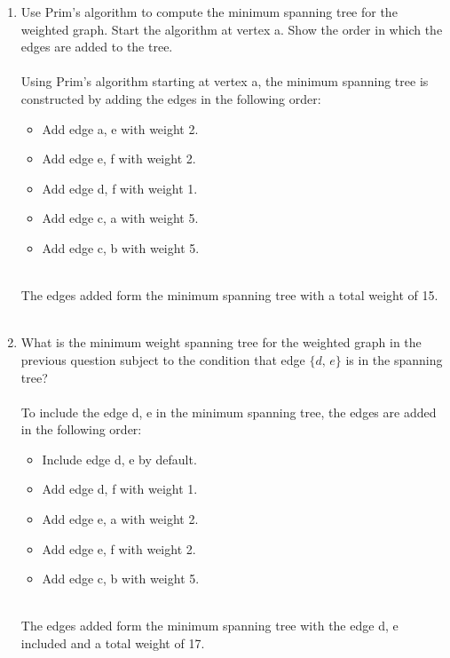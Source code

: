 \documentclass{amsart}
\theoremstyle{definition}
\theoremstyle{Exercise}
\theoremstyle{remark}
\theoremstyle{rule}
\numberwithin{equation}{section}
\begin{document}
\begin{enumerate}[label=(\alph*)]
\item Use Prim's algorithm to compute the minimum spanning tree for the weighted graph. Start the algorithm at vertex a. Show the order in which the edges are added to the tree.\\\\
Using Prim's algorithm starting at vertex a, the minimum spanning tree is constructed by adding the edges in the following order:\\
    \begin{itemize}
        \item Add edge {a, e} with weight 2.\\
        \item Add edge {e, f} with weight 2.\\
        \item Add edge {d, f} with weight 1.\\
        \item Add edge {c, a} with weight 5.\\
        \item Add edge {c, b} with weight 5.\\\\
    \end{itemize}
    The edges added form the minimum spanning tree with a total weight of 15.\\\\

\item What is the minimum weight spanning tree for the weighted graph in the previous question subject to the condition that edge $\{d,\, e\}$ is in the spanning tree?\\\\
To include the edge {d, e} in the minimum spanning tree, the edges are added in the following order:\\
    \begin{itemize}
        \item Include edge {d, e} by default.\\
        \item Add edge {d, f} with weight 1.\\
        \item Add edge {e, a} with weight 2.\\
        \item Add edge {e, f} with weight 2.\\
        \item Add edge {c, b} with weight 5.\\\\
    \end{itemize}
The edges added form the minimum spanning tree with the edge {d, e} included and a total weight of 17.\\\\


\end{enumerate}
\end{document}
